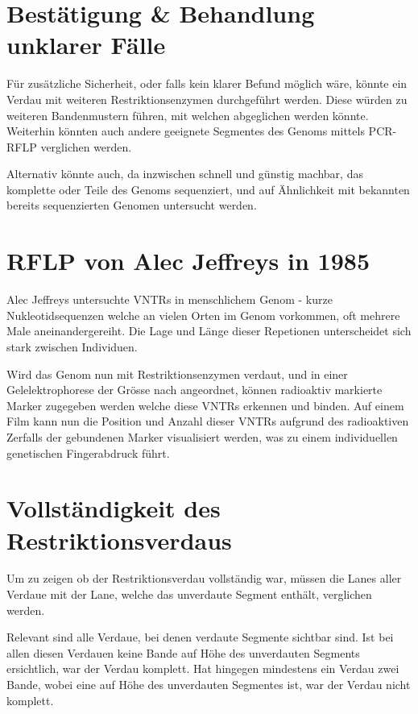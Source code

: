 \documentclass[a4paper,english]{scrreprt}
\begin{document}
\section{Bestätigung \& Behandlung unklarer Fälle}

Für zusätzliche Sicherheit, oder falls kein klarer Befund möglich wäre, könnte
ein Verdau mit weiteren Restriktionsenzymen durchgeführt werden. Diese würden
zu weiteren Bandenmustern führen, mit welchen abgeglichen werden könnte.
Weiterhin könnten auch andere geeignete Segmentes des Genoms mittels PCR-RFLP
verglichen werden.

Alternativ könnte auch, da inzwischen schnell und günstig machbar, das
komplette oder Teile des Genoms sequenziert, und auf Ähnlichkeit mit bekannten
bereits sequenzierten Genomen untersucht werden.

\section{RFLP von Alec Jeffreys in 1985\cite{Jeffreys1985}}

Alec Jeffreys untersuchte VNTRs in menschlichem Genom - kurze
Nukleotidsequenzen welche an vielen Orten im Genom vorkommen, oft mehrere Male
aneinandergereiht. Die Lage und Länge dieser Repetionen unterscheidet sich
stark zwischen Individuen.

Wird das Genom nun mit Restriktionsenzymen verdaut, und in einer
Gelelektrophorese der Grösse nach angeordnet, können radioaktiv markierte
Marker zugegeben werden welche diese VNTRs erkennen und binden. Auf einem Film
kann nun die Position und Anzahl dieser VNTRs aufgrund des radioaktiven
Zerfalls der gebundenen Marker visualisiert werden, was zu einem individuellen
genetischen Fingerabdruck führt.

\section{Vollständigkeit des Restriktionsverdaus}

Um zu zeigen ob der Restriktionsverdau vollständig war, müssen die Lanes aller
Verdaue mit der Lane, welche das unverdaute Segment enthält, verglichen werden.

Relevant sind alle Verdaue, bei denen verdaute Segmente sichtbar sind. Ist bei
allen diesen Verdauen keine Bande auf Höhe des unverdauten Segments ersichtlich,
war der Verdau komplett. Hat hingegen mindestens ein Verdau zwei Bande, wobei
eine auf Höhe des unverdauten Segmentes ist, war der Verdau nicht komplett.
\end{document}

